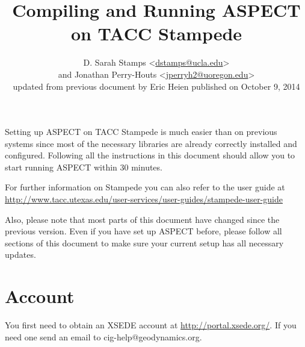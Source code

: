 \documentclass[12pt]{article}
\begin{document}
\title{Compiling and Running ASPECT on TACC Stampede}
\author{D. Sarah Stamps \textless\href{dstamps@ucla.edu}{dstamps@ucla.edu}\textgreater \\
and Jonathan Perry-Houts \textless\href{jperryh2@uoregon.edu}{jperryh2@uoregon.edu}\textgreater\\
updated from previous document by Eric Heien published on October 9, 2014}

\maketitle



Setting up ASPECT on TACC Stampede is much easier than on previous systems since
most of the necessary libraries are already correctly installed and configured. Following all
the instructions in this document should allow you to start running ASPECT within 30
minutes.

For further information on Stampede you can also refer to the user guide at \\\url{http://www.tacc.utexas.edu/user-services/user-guides/stampede-user-guide}

Also, please note that most parts of this document have changed since the previous
version. Even if you have set up ASPECT before, please follow all sections of this document
to make sure your current setup has all necessary updates.


\section{Account}
You first need to obtain an XSEDE account at \url{http://portal.xsede.org/}. If you need one send an email to cig-help@geodynamics.org.  
\end{document}
